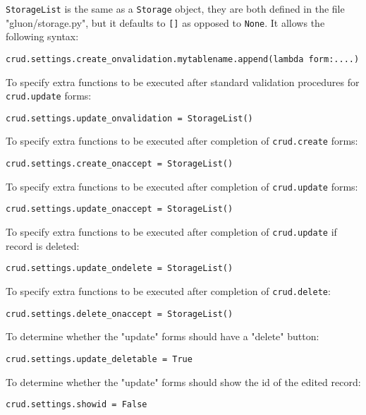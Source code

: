 \documentclass[justified,sixbynine,notoc]{tufte-book}
\def\ft{\small\tt}
\begin{document}
\begin{fullwidth}
{\ft StorageList} is the same as a {\ft Storage} object, they are both defined in the file "gluon/storage.py", but it defaults to {\ft []} as opposed to {\ft None}. It allows the following syntax:

\begin{lstlisting}
crud.settings.create_onvalidation.mytablename.append(lambda form:....)
\end{lstlisting}

To specify extra functions to be executed after        standard validation procedures for {\ft crud.update} forms:

\begin{lstlisting}
crud.settings.update_onvalidation = StorageList()
\end{lstlisting}

To specify extra functions to be executed after completion of {\ft crud.create} forms:

\begin{lstlisting}
crud.settings.create_onaccept = StorageList()
\end{lstlisting}

To specify extra functions to be executed after completion of {\ft crud.update} forms:

\begin{lstlisting}
crud.settings.update_onaccept = StorageList()
\end{lstlisting}

To specify extra functions to be executed after completion of {\ft crud.update} if record is deleted:

\begin{lstlisting}
crud.settings.update_ondelete = StorageList()
\end{lstlisting}

To specify extra functions to be executed after completion of {\ft crud.delete}:

\begin{lstlisting}
crud.settings.delete_onaccept = StorageList()
\end{lstlisting}

To determine whether the "update" forms should have a "delete" button:

\begin{lstlisting}
crud.settings.update_deletable = True
\end{lstlisting}

To determine whether the "update" forms should show the id of the edited record:

\begin{lstlisting}
crud.settings.showid = False
\end{lstlisting}


\end{fullwidth}
\end{document}
